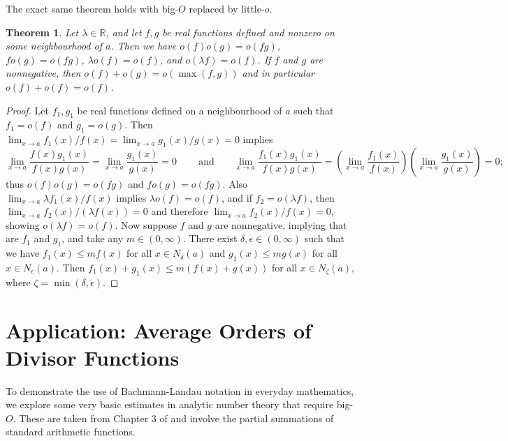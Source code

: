 \documentclass{article}
\newtheorem{theorem}{Theorem}
\theoremstyle{definition}
\newcommand\RR{\mathbb R}
\begin{document}
The exact same theorem holds with big-$O$ replaced by little-$o$.

\begin{theorem}
    Let \(\lambda\in\RR\), and let \(f,g\) be real functions defined and nonzero on some neighbourhood of \(a\).
    Then we have \(o(f)o(g) = o(fg)\), \(fo(g) = o(fg)\), \(\lambda o(f) = o(f)\), and \(o(\lambda f) = o(f)\).
    If \(f\) and \(g\) are nonnegative, then \(o(f) + o(g) = o(\max(f, g))\) and in particular \(o(f) + o(f) = o(f)\).
\end{theorem}

\begin{proof}
    Let \(f_1,g_1\) be real functions defined on a neighbourhood of \(a\) such that \(f_1 = o(f)\) and \(g_1 = o(g)\).
    Then \(\lim_{x\to a} f_1(x)/f(x) = \lim_{x\to a} g_1(x)/g(x) = 0\) implies
    \[\lim_{x\to a} \frac{f(x)g_1(x)}{f(x)g(x)} = \lim_{x\to a} \frac{g_1(x)}{g(x)} = 0\ \qquad \text{and} \qquad \lim_{x\to a} \frac{f_1(x)g_1(x)}{f(x)g(x)} = \left(\lim_{x\to a} \frac{f_1(x)}{f(x)}\right) \left(\lim_{x\to a} \frac{g_1(x)}{g(x)}\right) = 0;\]
    thus \(o(f)o(g)=o(fg)\) and \(fo(g)=o(fg)\).
    Also \(\lim_{x\to a} \lambda f_1(x)/f(x)\) implies \(\lambda o(f) = o(f)\), and if \(f_2 = o(\lambda f)\), then \(\lim_{x\to a} f_2(x)/(\lambda f(x)) = 0\) and therefore \(\lim_{x\to a} f_2(x)/f(x) = 0\), showing \(o(\lambda f) = o(f)\).
    Now suppose \(f\) and \(g\) are nonnegative, implying that are \(f_1\) and \(g_1\), and take any \(m\in(0,\infty)\).
    There exist \(\delta,\epsilon\in(0,\infty)\) such that we have \(f_1(x) \le mf(x)\) for all \(x\in N_{\delta}(a)\) and \(g_1(x) \le mg(x)\) for all \(x\in N_{\epsilon}(a)\).
    Then \(f_1(x) + g_1(x) \le m(f(x) + g(x))\) for all \(x\in N_{\zeta}(a)\), where \(\zeta = \min(\delta,\epsilon)\).
\end{proof}

\section{Application: Average Orders of Divisor Functions}\label{sec:applications}

To demonstrate the use of Bachmann-Landau notation in everyday mathematics, we explore some very basic estimates in analytic number theory that require big-$O$.
These are taken from Chapter 3 of \cite{Apostol1976} and involve the partial summations of standard arithmetic functions.
\end{document}
